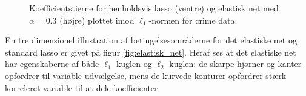 \begin{figure}[H]
\centering
\begin{minipage}{0.4\linewidth}
\end{minipage}
\hspace{0.2cm}
\begin{minipage}{0.4\linewidth}
\end{minipage}
\caption{Koefficientstierne for henholdsvis lasso (ventre) og elastisk net med \(\alpha=0.3\) (højre) plottet imod \(\ell_1\)-normen for crime data.} \label{fig:crime_koef_EN}
\end{figure}
%
En tre dimensionel illustration af betingelsesområderne for det elastiske net og standard lasso er givet på figur \ref{fig:elastisk_net}.
Heraf ses at det elastiske net har egenskaberne af både $\ell_1$ kuglen og $\ell_2$ kuglen: de skarpe hjørner og kanter opfordrer til variable udvælgelse, mens de kurvede konturer opfordrer stærk korreleret variable til at dele koefficienter.
